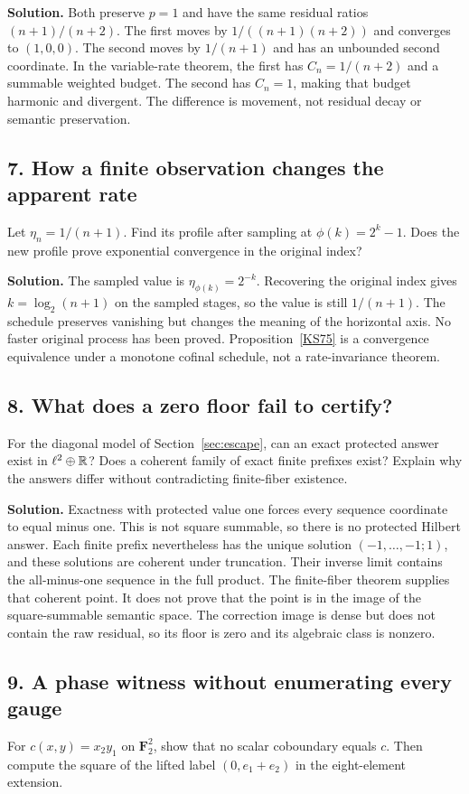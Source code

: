 \textbf{Solution.} Both preserve $p=1$ and have the same residual ratios $(n+1)/(n+2)$. The first moves by $1/((n+1)(n+2))$ and converges to $(1,0,0)$. The second moves by $1/(n+1)$ and has an unbounded second coordinate. In the variable-rate theorem, the first has $C_n=1/(n+2)$ and a summable weighted budget. The second has $C_n=1$, making that budget harmonic and divergent. The difference is movement, not residual decay or semantic preservation.

\subsection*{7. How a finite observation changes the apparent rate}
Let $\eta_n=1/(n+1)$. Find its profile after sampling at $\phi(k)=2^k-1$. Does the new profile prove exponential convergence in the original index?

\textbf{Solution.} The sampled value is $\eta_{\phi(k)}=2^{-k}$. Recovering the original index gives $k=\log_2(n+1)$ on the sampled stages, so the value is still $1/(n+1)$. The schedule preserves vanishing but changes the meaning of the horizontal axis. No faster original process has been proved. Proposition~\ref{KS75} is a convergence equivalence under a monotone cofinal schedule, not a rate-invariance theorem.

\subsection*{8. What does a zero floor fail to certify?}
For the diagonal model of Section~\ref{sec:escape}, can an exact protected answer exist in $\ell^2\oplus\mathbb R$? Does a coherent family of exact finite prefixes exist? Explain why the answers differ without contradicting finite-fiber existence.

\textbf{Solution.} Exactness with protected value one forces every sequence coordinate to equal minus one. This is not square summable, so there is no protected Hilbert answer. Each finite prefix nevertheless has the unique solution $(-1,\ldots,-1;1)$, and these solutions are coherent under truncation. Their inverse limit contains the all-minus-one sequence in the full product. The finite-fiber theorem supplies that coherent point. It does not prove that the point is in the image of the square-summable semantic space. The correction image is dense but does not contain the raw residual, so its floor is zero and its algebraic class is nonzero.

\subsection*{9. A phase witness without enumerating every gauge}
For $c(x,y)=x_2y_1$ on $\mathbf F_2^2$, show that no scalar coboundary equals $c$. Then compute the square of the lifted label $(0,e_1+e_2)$ in the eight-element extension.


